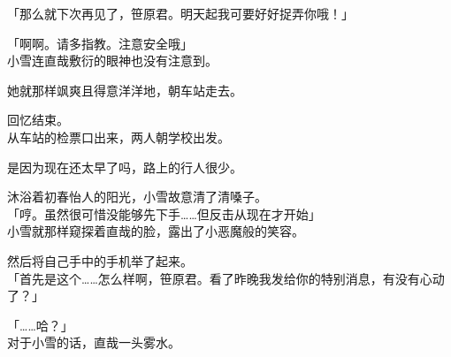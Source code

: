 「那么就下次再见了，笹原君。明天起我可要好好捉弄你哦！」

「啊啊。请多指教。注意安全哦」\\

小雪连直哉敷衍的眼神也没有注意到。

她就那样飒爽且得意洋洋地，朝车站走去。\\

\vspace{2\baselineskip}

回忆结束。\\

从车站的检票口出来，两人朝学校出发。

是因为现在还太早了吗，路上的行人很少。

沐浴着初春怡人的阳光，小雪故意清了清嗓子。\\

「哼。虽然很可惜没能够先下手……但反击从现在才开始」\\

小雪就那样窥探着直哉的脸，露出了小恶魔般的笑容。

然后将自己手中的手机举了起来。\\

「首先是这个……怎么样啊，笹原君。看了昨晚我发给你的特别消息，有没有心动了？」

「……哈？」\\

对于小雪的话，直哉一头雾水。\\

